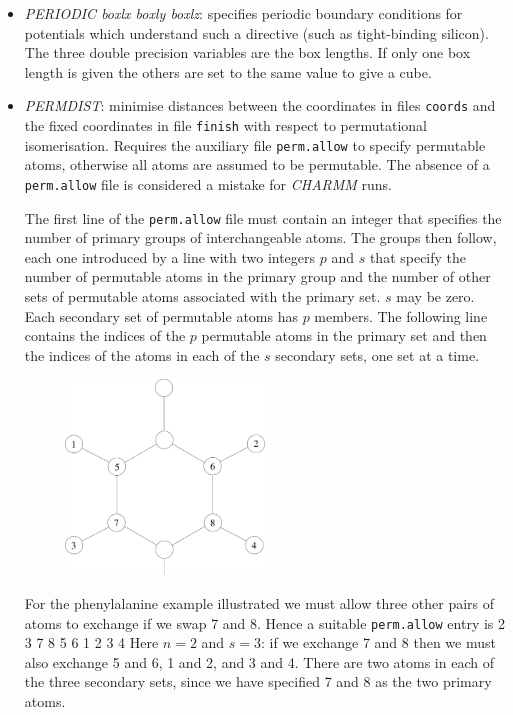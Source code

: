 \documentclass[12pt,a4paper,dvips]{article}
\begin{document}
\begin{itemize}
\item {\it PERIODIC boxlx boxly boxlz\/}: specifies periodic boundary conditions for
potentials which understand such a directive (such as tight-binding silicon). The three
double precision variables are the box lengths. If only one box length is given the
others are set to the same value to give a cube.

\item {\it PERMDIST\/}: minimise distances between 
the coordinates in files {\tt coords} and the
fixed coordinates in file {\tt finish} with respect to permutational isomerisation.
Requires the auxiliary file {\tt perm.allow} to specify permutable atoms, otherwise
all atoms are assumed to be permutable. The absence of a {\tt perm.allow}
file is considered a mistake for {\it CHARMM\/} runs.

The first line of the {\tt perm.allow} file must contain an integer
that specifies the number of primary groups of interchangeable atoms.
The groups then follow, each one introduced by a line with two integers $p$ and $s$
that specify the number of permutable atoms in the primary group and the number of other sets
of permutable atoms associated with the primary set.
$s$ may be zero.
Each secondary set of permutable atoms has $p$ members.
The following line contains the indices of the $p$ permutable atoms 
in the primary set and then
the indices of the atoms in each of the $s$ secondary sets, one set at 
a time.

\begin{figure}[hH]
\centerline{\includegraphics[width=0.5\textwidth]{PHE.eps}}
\end{figure}

For the phenylalanine example illustrated we must allow three other pairs of
atoms to exchange if we swap 7 and 8. Hence a suitable {\tt perm.allow} entry is
{
2 3
7 8 5 6 1 2 3 4
}
Here $n=2$ and $s=3$: if we exchange 7 and 8 then we must also exchange 5 and 6,
1 and 2, and 3 and 4. There are two atoms in each of the three secondary sets, 
since we have specified 7 and 8 as the two primary atoms.


\end{itemize}
\end{document}
